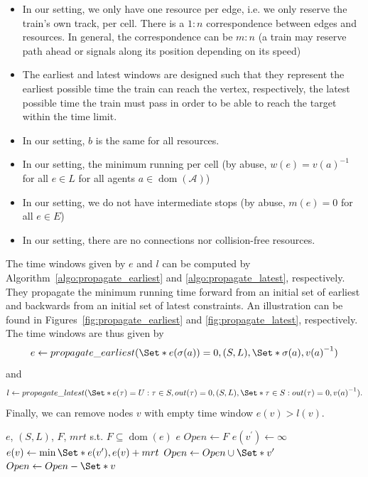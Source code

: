 \documentclass{article}
\DeclareMathOperator{\dom}{dom}
\begin{document}
\begin{itemize}
    \item In our setting, we only have one resource per edge, i.e. we only reserve the train's own track, per cell. There is a $1:n$ correspondence between edges and resources. In general, the correspondence can be $m:n$ (a train may reserve path ahead or signals along its position depending on its speed)
    \item The earliest and latest windows are designed such that they represent the earliest possible time the train can reach the vertex, respectively, the latest possible time the train must pass in order to be able to reach the target within the time limit.
    \item In our setting, $b$ is the same for all resources.
    \item In our setting, the minimum running per cell (by abuse, $w(e)= {v(a)}^{-1}$  for all $e \in L$ for all agents $a \in \dom(\mathcal{A})$)
    \item In our setting, we do not have intermediate stops (by abuse, $m(e)=0$ for all $e \in E$)
    \item In our setting, there are no connections nor collision-free resources.
\end{itemize}

The time windows given by $e$ and $l$ can be computed by Algorithm~\ref{algo:propagate_earliest} and \ref{algo:propagate_latest}, respectively. They propagate the minimum running time forward from an initial set of earliest and backwards from an initial set of latest constraints. An illustration can be found in Figures~\ref{fig:propagate_earliest} and \ref{fig:propagate_latest}, respectively.
The time windows are thus given by
$$e\leftarrow propagate\_earliest(\Set*{e(\sigma(a))=0}, (S,L), \Set*{\sigma(a)}, {v(a)}^{-1})$$ and $$l\leftarrow propagate\_latest(\Set*{e(\tau)=U: \tau \in S, out(\tau)=0}, (S,L), \Set*{\tau \in S: out(\tau)=0},{v(a)}^{-1}).$$
Finally, we can remove nodes $v$ with empty time window $e(v)>l(v)$.





\begin{algorithm}
	\caption{$propagate\_earliest$} \label{algo:propagate_earliest}
	\begin{algorithmic}[1]
	    \Require $e$, $(S,L)$, $F$, $mrt$ s.t. $F\subseteq \dom(e)$
	    \Ensure $e$
	    \State $Open \leftarrow F$
    	        \If{$v^\prime \not\in \dom(e)$}
    	            \State $e(v^\prime) \leftarrow \infty$
    	        \EndIf
    			\State $e(v) \leftarrow \min \Set*{e(v^\prime), e(v)+mrt}$
    			\State $Open \leftarrow Open \cup \Set*{v^\prime}$
    		\EndFor
			\State $Open \leftarrow Open - \Set*{v}$
		\EndFor
	\end{algorithmic}
\end{algorithm}
\end{document}
